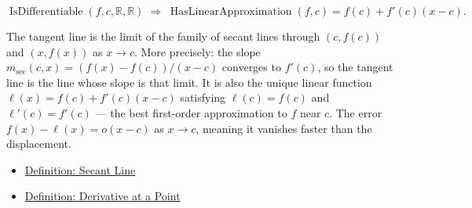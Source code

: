 \begin{remark*}
\[
\operatorname{IsDifferentiable}(f,c,\mathbb{R},\mathbb{R}) \;\Rightarrow\;
\operatorname{HasLinearApproximation}(f, c) = f(c) + f'(c)(x - c).
\]
\end{remark*}

\begin{remark*}[Interpretation]
The tangent line is the limit of the family of secant lines through $(c, f(c))$ and $(x, f(x))$ as $x \to c$. More precisely: the slope $m_{\mathrm{sec}}(c, x) = (f(x)-f(c))/(x-c)$ converges to $f'(c)$, so the tangent line is the line whose slope is that limit. It is also the unique linear function $\ell(x) = f(c) + f'(c)(x-c)$ satisfying $\ell(c) = f(c)$ and $\ell'(c) = f'(c)$ --- the best first-order approximation to $f$ near $c$. The error $f(x) - \ell(x) = o(x-c)$ as $x \to c$, meaning it vanishes faster than the displacement.
\end{remark*}

\begin{dependencies}
\begin{itemize}
  \item \hyperref[def:secant-line]{Definition: Secant Line}
  \item \hyperref[def:derivative-at-a-point]{Definition: Derivative at a Point}
\end{itemize}
\end{dependencies}


